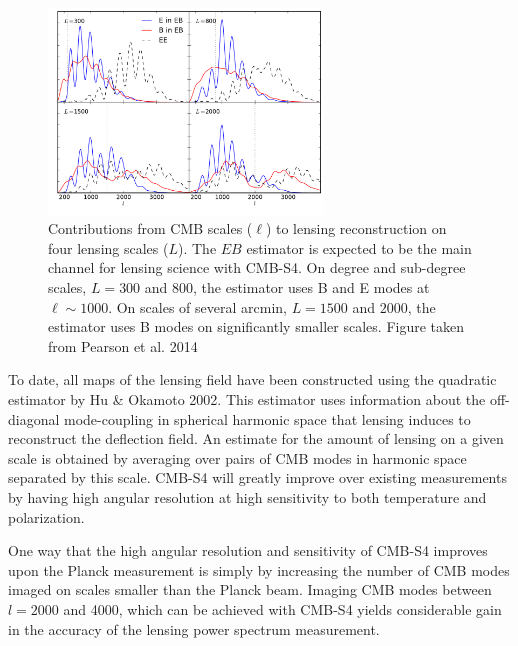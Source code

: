 \begin{figure}[htbp]
\centering
\includegraphics[width=0.65\textwidth]{CMBLensing/signal_contribs.pdf}
\caption{Contributions from CMB scales ($\ell$) to lensing reconstruction on four lensing scales ($L$).  The $EB$ estimator is expected to be the main channel for lensing science with CMB-S4.  On degree and sub-degree scales, $L = 300$ and $800$, the estimator uses B and E modes at $\ell \sim 1000$.  On scales of several arcmin, $L = 1500$ and $2000$, the estimator uses B modes on significantly smaller scales.  Figure taken from Pearson et al. 2014}
\label{sigCon}
\end{figure}

To date, all maps of the lensing field have been constructed using the quadratic estimator by Hu \& Okamoto 2002.  This estimator uses information about the off-diagonal mode-coupling in spherical harmonic space that lensing induces to reconstruct the deflection field.  An estimate for the amount of lensing on a given scale is obtained by averaging over pairs of CMB modes in harmonic space separated by this scale. CMB-S4 will greatly improve over existing
measurements by having high angular resolution at high sensitivity to
both temperature and polarization.

One way that the high angular resolution and sensitivity
of CMB-S4 improves upon the Planck measurement is simply
by increasing the number of CMB modes imaged on scales smaller than the Planck beam.  Imaging CMB modes between $l=2000$ and 4000, which can be achieved with CMB-S4 yields considerable gain in the accuracy of the lensing power spectrum measurement.

